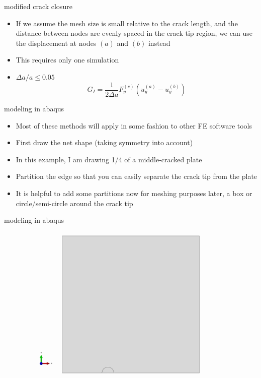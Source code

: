 \documentclass[10pt]{beamer}
\begin{document}
	\begin{frame}{modified crack closure}
		\begin{itemize}[<+->]
			\item If we assume the mesh size is small relative to the crack length, and the distance between nodes are evenly spaced in the crack tip region, we can use the displacement at nodes $(a)$ and $(b)$ instead
			\item This requires only one simulation
			\item $\Delta a / a \le 0.05$
			\begin{equation}
			G_I = \frac{1}{2\Delta a} F_y^{(c)} \left(u_y^{(a)}-u_y^{(b)}\right)
			\end{equation}
		\end{itemize}
	\end{frame}
	
	\begin{frame}{modeling in abaqus}
		\begin{itemize}[<+->]
			\item Most of these methods will apply in some fashion to other FE software tools
			\item First draw the net shape (taking symmetry into account)
			\item In this example, I am drawing 1/4 of a middle-cracked plate
			\item Partition the edge so that you can easily separate the crack tip from the plate
			\item It is helpful to add some partitions now for meshing purposes later, a box or circle/semi-circle around the crack tip
		\end{itemize}
	\end{frame}
	
	\begin{frame}{modeling in abaqus}
		\begin{figure}
		\centering
		\includegraphics[width=0.7\linewidth]{../Figures/partition}
		\label{fig:partition}
		\end{figure}
	\end{frame}
	
\end{document}
